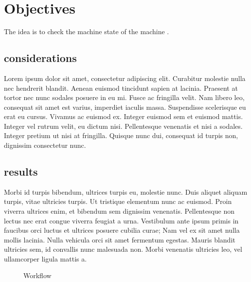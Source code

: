 \section{Objectives}

The idea is to check the machine state of the machine \textbf{\actualMachine}.

\subsection{considerations}
Lorem ipsum dolor sit amet, consectetur adipiscing elit. Curabitur molestie nulla nec hendrerit
blandit. Aenean euismod tincidunt sapien at lacinia. Praesent at tortor nec nunc sodales posuere in
eu mi. Fusce ac fringilla velit. Nam libero leo, consequat sit amet est varius, imperdiet iaculis
massa. Suspendisse scelerisque eu erat eu cursus. Vivamus ac euismod ex. Integer euismod sem et 
euismod mattis. Integer vel rutrum velit, eu dictum nisi. Pellentesque venenatis et nisi a sodales.
Integer pretium ut nisi at fringilla. Quisque nunc dui, consequat id turpis non, dignissim 
consectetur nunc.

\subsection{results}
Morbi id turpis bibendum, ultrices turpis eu, molestie nunc. Duis aliquet aliquam turpis, vitae
ultricies turpis. Ut tristique elementum nunc ac euismod. Proin viverra ultrices enim, et bibendum
sem dignissim venenatis. Pellentesque non lectus nec erat congue viverra feugiat a urna. Vestibulum
ante ipsum primis in faucibus orci luctus et ultrices posuere cubilia curae; Nam vel ex sit amet
nulla mollis lacinia. Nulla vehicula orci sit amet fermentum egestas. Mauris blandit ultricies sem,
id convallis nunc malesuada non. Morbi venenatis ultricies leo, vel ullamcorper ligula mattis a.

\vspace{0.3cm}

\begin{figure}[h]
    \begin{center}
    \end{center}
    \caption{Workflow}
\end{figure}

\clearpage